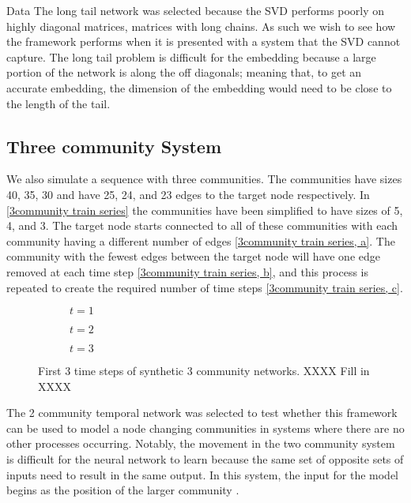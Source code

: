 \documentclass[12pt]{amsart}
\begin{document}
\begin{section}{Data}
        The long tail network was selected because the SVD performs poorly on highly diagonal matrices, matrices with long chains. As such we wish to see how the framework performs when it is presented with a system that the SVD cannot capture. The long tail problem is difficult for the embedding because a large portion of the network is along the off diagonals; meaning that, to get an accurate embedding, the dimension of the embedding would need to be close to the length of the tail. 

    \subsection{Three community System}
    We also simulate a sequence with three communities. The communities have sizes 40, 35, 30 and have 25, 24, and 23 edges to the target node respectively. In \autoref{3community train series} the communities have been simplified to have sizes of 5, 4, and 3. The target node starts connected to all of these communities with each community having a different number of edges \autoref{3community train series, a}. The community with the fewest edges between the target node will have one edge removed at each time step \autoref{3community train series, b}, and this process is repeated to create the required number of time steps \autoref{3community train series, c}.  
    \begin{figure}[H]
        \centering
        \centering
        \begin{subfigure}[c]{0.3\textwidth}
            \centering
            \resizebox{.6\width}{!}{}
            \caption{$t=1$}
            \label{3community train series, a}
        \end{subfigure}
        \hfill
        \centering
        \begin{subfigure}[c]{0.3\textwidth}
            \centering
            \resizebox{.6\width}{!}{}
            \caption{$t=2$}
            \label{3community train series, b}            
        \end{subfigure}
        \hfill
        \centering
        \begin{subfigure}[c]{0.3\textwidth}
            \centering
            \resizebox{.6\width}{!}{}
            \caption{$t=3$}
            \label{3community train series, c}
        \end{subfigure}
        \caption{First 3 time steps of synthetic 3 community networks. XXXX Fill in XXXX}
        \label{3community train series}
    \end{figure}
    The 2 community temporal network was selected to test whether this framework can be used to model a node changing communities in systems where there are no other processes occurring. Notably, the movement in the two community system is difficult for the neural network to learn because the same set of opposite sets of inputs need to result in the same output. In this system, the input for the model begins as the position of the larger community . 
    


\end{section}
\end{document}
